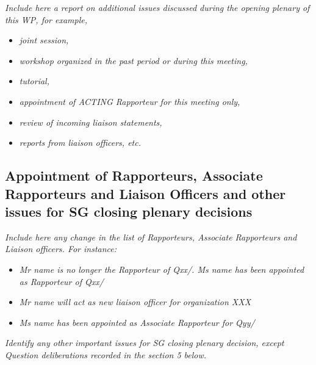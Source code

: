 \textit{Include here a report on additional issues discussed during the opening plenary of this WP, for example,}

\begin{itemize}
    \item \textit{joint session,}
    \item \textit{workshop organized in the past period or during this meeting,}
    \item \textit{tutorial,}
    \item \textit{appointment of ACTING Rapporteur for this meeting only,}
    \item \textit{review of incoming liaison statements,}
    \item \textit{reports from liaison officers, etc.}
\end{itemize}

\subsection{Appointment of Rapporteurs, Associate Rapporteurs and Liaison Officers and other issues for SG\studyGroup{} closing plenary decisions}\label{appointment-of-rapporteurs}

\textit{Include here any change in the list of Rapporteurs, Associate Rapporteurs and Liaison officers. For instance:}

\begin{itemize}
    \item \textit{Mr name is no longer the Rapporteur of Qxx/\studyGroup. Ms name has been appointed as Rapporteur of Qxx/\studyGroup}
    \item \textit{Mr name will act as new liaison officer for organization XXX}
    \item \textit{Ms name has been appointed as Associate Rapporteur for Qyy/\studyGroup}
\end{itemize}

\textit{Identify any other important issues for SG\studyGroup{} closing plenary decision, except Question deliberations recorded in the section 5 below.}
